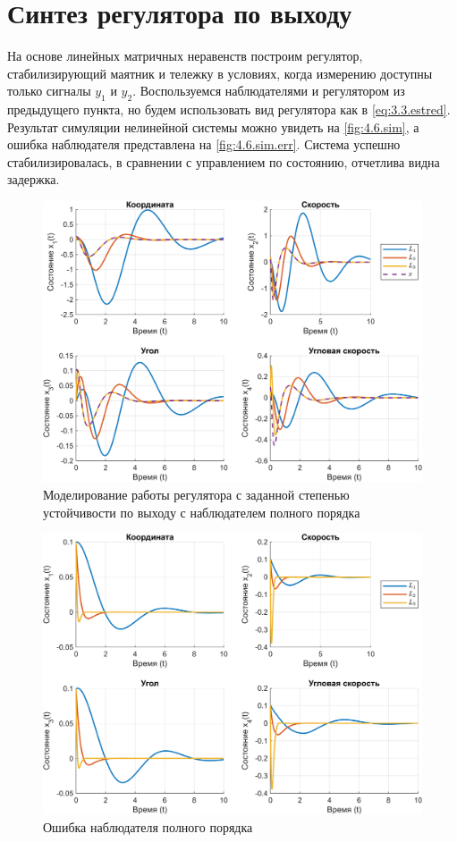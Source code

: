 \section{Синтез регулятора по выходу}
На основе линейных матричных неравенств построим регулятор, стабилизирующий 
маятник и тележку в условиях, когда измерению доступны только сигналы 
$y_1$ и $y_2$. Воспользуемся наблюдателями и регулятором из предыдущего
пункта, но будем использовать вид регулятора как в \eqref{eq:3.3.estred}.
Результат симуляции нелинейной системы можно увидеть на \autoref{fig:4.6.sim},
а ошибка наблюдателя представлена на \autoref{fig:4.6.sim.err}.
Система успешно стабилизировалась, в сравнении с управлением по состоянию,
отчетлива видна задержка.
\begin{figure}[H]
    \centering
    \includegraphics[width=\linewidth]{figs/4.6.sim.png}
    \caption{Моделирование работы регулятора с заданной степенью устойчивости
    по выходу с наблюдателем полного порядка}
    \label{fig:4.6.sim}
\end{figure}
\begin{figure}[H]
    \centering
    \includegraphics[width=\linewidth]{figs/4.6.sim.err.png}
    \caption{Ошибка наблюдателя полного порядка}
    \label{fig:4.6.sim.err}
\end{figure}

